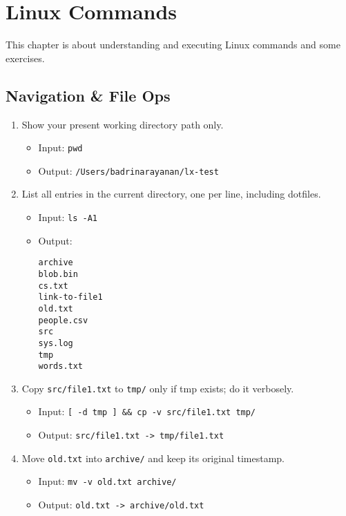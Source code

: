\chapter{Linux Commands}
\label{chap:linux}

This chapter is about understanding and executing Linux commands and some exercises.

\section{Navigation \& File Ops}

\begin{enumerate}
\item Show your present working directory path only.
\begin{itemize}
\item Input: \texttt{pwd}
\item Output: \texttt{/Users/badrinarayanan/lx-test}
\end{itemize}

\item List all entries in the current directory, one per line, including dotfiles.
\begin{itemize}
\item Input: \texttt{ls -A1}
\item Output:
\begin{verbatim}
archive
blob.bin
cs.txt
link-to-file1
old.txt
people.csv
src
sys.log
tmp
words.txt
\end{verbatim}
\end{itemize}

\item Copy \texttt{src/file1.txt} to \texttt{tmp/} only if tmp exists; do it verbosely.
\begin{itemize}
\item Input: \texttt{[ -d tmp ] \&\& cp -v src/file1.txt tmp/}
\item Output: \texttt{src/file1.txt -> tmp/file1.txt}
\end{itemize}

\item Move \texttt{old.txt} into \texttt{archive/} and keep its original timestamp.
\begin{itemize}
\item Input: \texttt{mv -v old.txt archive/}
\item Output: \texttt{old.txt -> archive/old.txt}
\end{itemize}


\end{enumerate}
